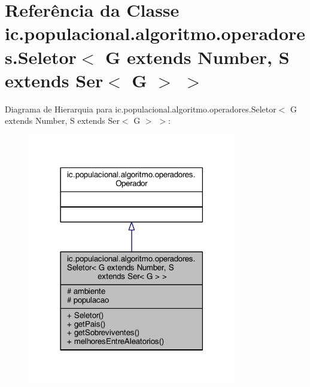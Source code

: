 \hypertarget{classic_1_1populacional_1_1algoritmo_1_1operadores_1_1_seletor_3_01_g_01extends_01_number_00_01_23b601396f2a06ce9087495b09b33964}{\section{Referência da Classe ic.\-populacional.\-algoritmo.\-operadores.\-Seletor$<$ G extends Number, S extends Ser$<$ G $>$ $>$}
\label{classic_1_1populacional_1_1algoritmo_1_1operadores_1_1_seletor_3_01_g_01extends_01_number_00_01_23b601396f2a06ce9087495b09b33964}
}


Diagrama de Hierarquia para ic.\-populacional.\-algoritmo.\-operadores.\-Seletor$<$ G extends Number, S extends Ser$<$ G $>$ $>$\-:\nopagebreak
\begin{figure}[H]
\begin{center}
\leavevmode
\includegraphics[width=258pt]{classic_1_1populacional_1_1algoritmo_1_1operadores_1_1_seletor_3_01_g_01extends_01_number_00_01_3e7ddd218e5e3a10b75ad457ea7ebdc8}
\end{center}
\end{figure}


